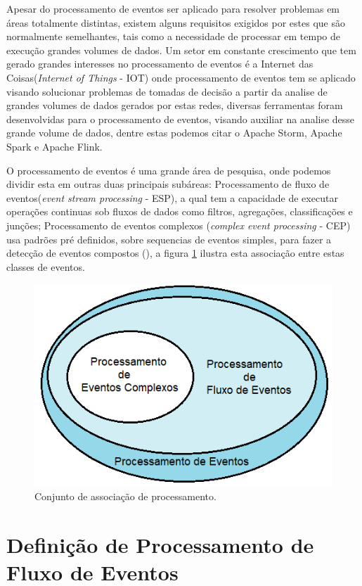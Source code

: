 \documentclass[tid,table]{texufpel} %
\begin{document}
Apesar do processamento de eventos ser aplicado para resolver problemas em áreas totalmente distintas, existem alguns requisitos exigidos por estes que são normalmente semelhantes, tais como a necessidade de processar em tempo de execução grandes volumes de dados. Um setor em constante  crescimento que tem gerado grandes interesses no processamento de eventos é a Internet das Coisas(\textit{Internet of Things} - IOT) onde processamento de eventos tem se aplicado visando solucionar problemas de tomadas de decisão a partir da analise de grandes volumes de dados gerados por estas redes, diversas ferramentas foram desenvolvidas para o processamento de eventos, visando auxiliar na analise desse grande volume de dados, dentre estas podemos citar o Apache Storm, Apache Spark e Apache Flink.

O processamento de eventos é uma grande área de pesquisa, onde podemos dividir esta em outras duas principais subáreas: Processamento de fluxo de eventos(\textit{event stream processing} - ESP), a qual tem a capacidade de executar operações continuas sob fluxos de dados como filtros, agregações, classificações e junções; Processamento de eventos complexos (\textit{complex event processing} - CEP) usa padrões pré definidos, sobre sequencias de eventos simples, para fazer a detecção de eventos compostos (\cite{dayarathna2018recent}), a figura \ref{fig:ConjuntoProcessamento} ilustra esta associação entre estas classes de eventos.


\begin{figure}[ht]
	\centering
	\includegraphics[width=.6\textwidth]{imagens/ConjuntoProcessamento.png}
	\caption{Conjunto de associação de processamento.}
	\label{fig:ConjuntoProcessamento}
\end{figure}


\section{Definição de Processamento de Fluxo de Eventos}
\end{document}
